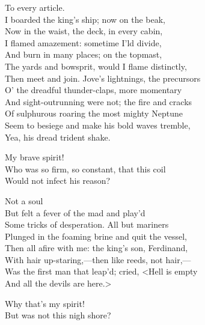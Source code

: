 \begin{verse_speech}[Ariel] 
To every article.\\
I boarded the king's ship; now on the beak,\\
Now in the waist, the deck, in every cabin,\\
I flamed amazement: sometime I'ld divide,\\
And burn in many places; on the topmast,\\
The yards and bowsprit, would I flame distinctly,\\
Then meet and join. Jove's lightnings, the precursors\\
O' the dreadful thunder-claps, more momentary\\
And sight-outrunning were not; the fire and cracks\\
Of sulphurous roaring the most mighty Neptune\\
Seem to besiege and make his bold waves tremble,\\
Yea, his dread trident shake.
\end{verse_speech}

\begin{verse_speech}[Prospero] 
My brave spirit!\\
Who was so firm, so constant, that this coil\\
Would not infect his reason?
\end{verse_speech}

\begin{verse_speech}[Ariel] 
Not a soul\\
But felt a fever of the mad and play'd\\
Some tricks of desperation. All but mariners\\
Plunged in the foaming brine and quit the vessel,\\
Then all afire with me: the king's son, Ferdinand,\\
With hair up-staring,—then like reeds, not hair,—\\
Was the first man that leap'd; cried, <Hell is empty\\
And all the devils are here.>
\end{verse_speech}

\begin{verse_speech}[Prospero] 
Why that's my spirit!\\
But was not this nigh shore?
\end{verse_speech}

